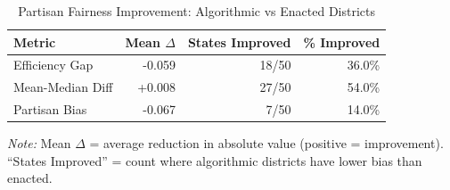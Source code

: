 \begin{table}[t]
\caption{Partisan Fairness Improvement: Algorithmic vs Enacted Districts}
\label{tab:partisan-improvement}
\centering
\begin{tabular}{@{}lrrr@{}}
\toprule
\textbf{Metric} & \textbf{Mean $\Delta$} & \textbf{States Improved} & \textbf{\% Improved} \\
\midrule
Efficiency Gap & -0.059 & 18/50 & 36.0\% \\
Mean-Median Diff & +0.008 & 27/50 & 54.0\% \\
Partisan Bias & -0.067 & 7/50 & 14.0\% \\
\bottomrule
\end{tabular}
\vspace{0.5em}

\footnotesize
\textit{Note:} Mean $\Delta$ = average reduction in absolute value (positive = improvement).
``States Improved'' = count where algorithmic districts have lower bias than enacted.
\end{table}
